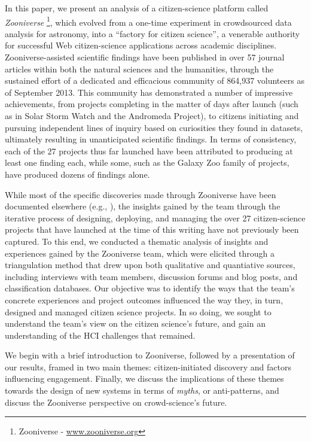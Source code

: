 \documentclass{sigchi}
\begin{document}
In this paper, we present an analysis of a citizen-science platform called \emph{Zooniverse} \footnote{Zooniverse - \url{www.zooniverse.org}}, which evolved from a one-time experiment in crowdsourced data analysis for astronomy, into a ``factory for citizen science'', a venerable authority for successful Web citizen-science applications across academic disciplines. Zooniverse-assisted scientific findings have been published in over 57 journal articles within both the natural sciences and the humanities, through the sustained effort of a dedicated and efficacious community of 864,937 volunteers as of September 2013.  This community has demonstrated a number of impressive achievements, from projects completing in the matter of days after launch (such as in Solar Storm Watch and the Andromeda Project), to citizens initiating and pursuing independent lines of inquiry based on curiosities they found in datasets, ultimately resulting in unanticipated scientific findings.  In terms of consistency, each of the 27 projects thus far launched have been attributed to producing at least one finding each, while some, such as the Galaxy Zoo family of projects, have produced dozens of findings alone.

While most of the specific discoveries made through Zooniverse have been documented elsewhere (e.g., \cite{lintott2008galaxy,lintott2009galaxy,story-of-the-peas,simpson2013dynamic}), the insights gained by the team through the iterative process of designing, deploying, and managing the over 27 citizen-science projects that have launched at the time of this writing have not previously been captured. To this end, we conducted a thematic analysis of insights and experiences gained by the Zooniverse team, which were elicited through a triangulation method that drew upon both qualitative and quantiative sources, including interviews with team members, discussion forums and blog posts, and classification databases.  Our objective was to identify the ways that the team's concrete experiences and project outcomes influenced the way they, in turn, designed and managed citizen science projects.  In so doing, we sought to understand the team's view on the citizen science's future, and gain an understanding of the HCI challenges that remained.


We begin with a brief introduction to Zooniverse, followed by a presentation of our results, framed in two main themes: citizen-initiated discovery and factors influencing engagement.  Finally, we discuss the implications of these themes towards the design of new systems in terms of \emph{myths}, or anti-patterns, and discuss the Zooniverse perspective on crowd-science's future.
\end{document}

